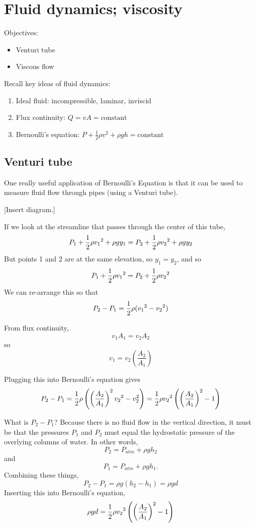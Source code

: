\section{Fluid dynamics; viscosity}
Objectives:
\begin{itemize}
\item Venturi tube
\item Viscous flow
\end{itemize}

\hrulefill

Recall key ideas of fluid dynamics:
\begin{enumerate}
\item Ideal fluid: incompressible, laminar, inviscid
\item Flux continuity: $Q=vA=\mbox{constant}$
\item Bernoulli's equation: $P+\frac{1}{2}\rho v^2+\rho gh=\mbox{constant}$
\end{enumerate}

\subsection{Venturi tube}
One really useful application of Bernoulli's Equation is that it can be used to measure fluid flow through pipes (using a Venturi tube).

[Insert diagram.]
\vspace{5cm}

If we look at the streamline that passes through the center of this tube,
$$P_1+\frac{1}{2}\rho v_1\displaystyle^2+\rho gy_1=P_2+\frac{1}{2}\rho v_2\displaystyle^2+\rho gy_2$$
But points 1 and 2 are at the same elevation, so $y_1=y_2$, and so
$$P_1+\frac{1}{2}\rho v_1\displaystyle^2=P_2+\frac{1}{2}\rho v_2\displaystyle^2$$
We can re-arrange this so that
$$P_2-P_1=\frac{1}{2}\rho(v_1\displaystyle^2-v_2\displaystyle^2)$$

From flux continuity, 
$$v_1A_1=v_2A_2$$
so 
$$v_1=v_2\left(\frac{A_2}{A_1}\right)$$

Plugging this into Bernoulli's equation gives
$$P_2-P_1=\frac{1}{2}\rho\left(\left(\frac{A_2}{A_1}\right)^2v_2\displaystyle^2-v_2^2\right)=\frac{1}{2}\rho v_2\displaystyle^2\left(\left(\frac{A_2}{A_1}\right)^2-1\right)$$

What is $P_2-P_1$? Because there is no fluid flow in the vertical direction, it must be that the pressures $P_1$ and $P_2$ must equal the hydrostatic pressure of the overlying columns of water. In other words,
$$P_2 = P_{atm}+\rho g h_2$$
and
$$P_1 = P_{atm}+\rho g h_1.$$
Combining these things,
$$P_2-P_1=\rho g (h_2-h_1) = \rho gd$$
Inserting this into Bernoulli's equation,
$$\rho gd=\frac{1}{2}\rho v_2\displaystyle^2\left(\left(\frac{A_2}{A_1}\right)^2-1\right)$$

